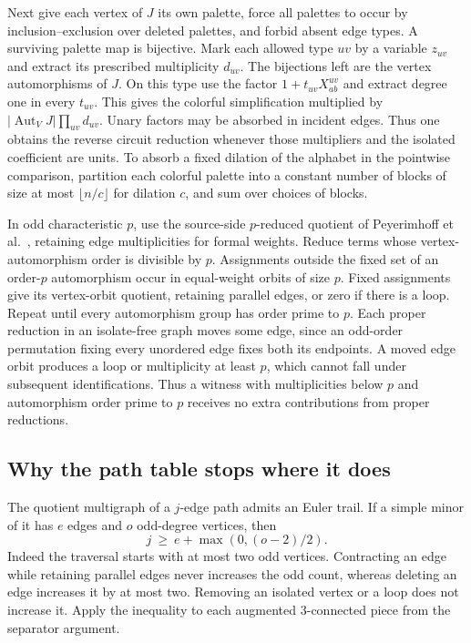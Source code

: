 \documentclass[11pt,letterpaper]{article}
\begin{document}
Next give each vertex of \(J\) its own palette, force all palettes to occur by inclusion--exclusion over deleted palettes, and forbid absent edge types. A surviving palette map is bijective. Mark each allowed type \(uv\) by a variable \(z_{uv}\) and extract its prescribed multiplicity \(d_{uv}\). The bijections left are the vertex automorphisms of \(J\). On this type use the factor \(1+t_{uv}X^{uv}_{ab}\) and extract degree one in every \(t_{uv}\). This gives the colorful simplification multiplied by \(|\operatorname{Aut}_V J|\prod_{uv}d_{uv}\). Unary factors may be absorbed in incident edges. Thus one obtains the reverse circuit reduction whenever those multipliers and the isolated coefficient are units. To absorb a fixed dilation of the alphabet in the pointwise comparison, partition each colorful palette into a constant number of blocks of size at most \(\lfloor n/c\rfloor\) for dilation \(c\), and sum over choices of blocks.

In odd characteristic \(p\), use the source-side \(p\)-reduced quotient of Peyerimhoff et al.~\cite[Definition~6.1 and Lemma~6.2]{prssv-modular}, retaining edge multiplicities for formal weights. Reduce terms whose vertex-automorphism order is divisible by \(p\). Assignments outside the fixed set of an order-\(p\) automorphism occur in equal-weight orbits of size \(p\). Fixed assignments give its vertex-orbit quotient, retaining parallel edges, or zero if there is a loop. Repeat until every automorphism group has order prime to \(p\). Each proper reduction in an isolate-free graph moves some edge, since an odd-order permutation fixing every unordered edge fixes both its endpoints. A moved edge orbit produces a loop or multiplicity at least \(p\), which cannot fall under subsequent identifications. Thus a witness with multiplicities below \(p\) and automorphism order prime to \(p\) receives no extra contributions from proper reductions.

\subsection{Why the path table stops where it does}\label{why-the-path-table-stops-where-it-does}

The quotient multigraph of a \(j\)-edge path admits an Euler trail. If a simple minor of it has \(e\) edges and \(o\) odd-degree vertices, then
\[
                        j\ \ge\ e+\max(0,(o-2)/2).
\]
Indeed the traversal starts with at most two odd vertices. Contracting an edge while retaining parallel edges never increases the odd count, whereas deleting an edge increases it by at most two. Removing an isolated vertex or a loop does not increase it. Apply the inequality to each augmented 3-connected piece from the separator argument.
\end{document}
